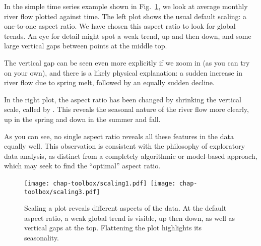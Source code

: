 In the simple time series example shown in Fig.~\ref{scaling}, we
look at average monthly river flow plotted against time.  The left
plot shows the usual default scaling: a one-to-one aspect ratio.  We
have chosen this aspect ratio to look for global trends.  An eye for
detail might spot a weak trend, up and then down, and some
large vertical gaps between points at the middle top.

The vertical gap can be seen even more explicitly if we zoom in (as
you can try on your own), and there is a likely physical explanation: a
sudden increase in river flow due to spring melt, followed by an
equally sudden decline.

In the right plot, the aspect ratio has been changed by shrinking the
vertical scale, called  by .  This
reveals the seasonal nature of the river flow more clearly, up
in the spring and down in the summer and fall.

As you can see, no single aspect ratio reveals all these
features in the data equally well.  This observation is consistent
with the philosophy of exploratory data analysis, as distinct from a
completely algorithmic or model-based approach, which may seek to
find the ``optimal'' aspect ratio.

\begin{figure}[htp]
\hbox{\texttt{[image: chap-toolbox/scaling1.pdf]}
      \texttt{[image: chap-toolbox/scaling3.pdf]}}
\caption[Scaling a plot reveals different aspects of the  data]{Scaling a plot reveals different aspects of the
 data. At the default aspect ratio, a weak global
trend is visible, up then down, as well as vertical gaps at the
top. Flattening the plot highlights its seasonality.}
\label{scaling}
\end{figure}


